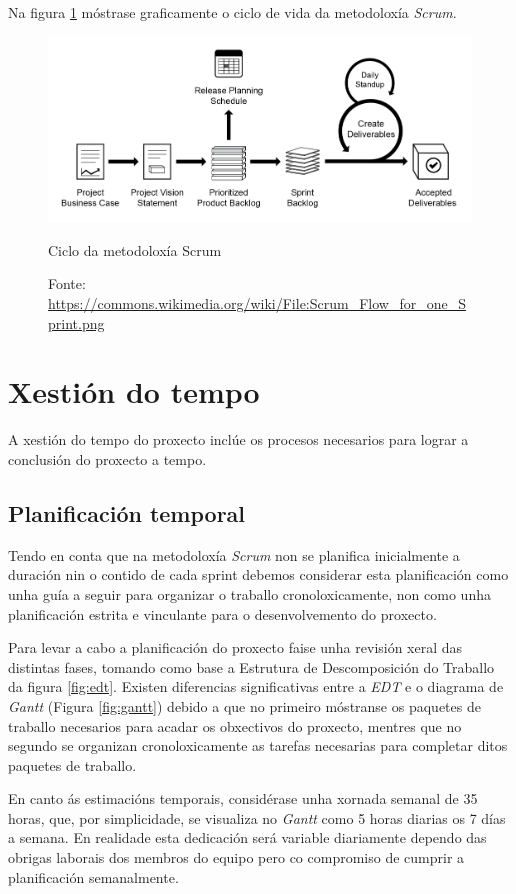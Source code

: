Na figura \ref{fig:scrum} móstrase graficamente o ciclo de vida da metodoloxía \emph{Scrum}.
\begin{figure}[hbtp]
  \centering
  \includegraphics[width=1.0\textwidth]{images/Scrum.png}
  \caption{Ciclo da metodoloxía Scrum}
  \label{fig:scrum}
  \caption*{Fonte: \url{https://commons.wikimedia.org/wiki/File:Scrum_Flow_for_one_Sprint.png}}
\end{figure}

\section{Xestión do tempo}
A xestión do tempo do proxecto inclúe os procesos necesarios para lograr a conclusión do proxecto a tempo.

\subsection{Planificación temporal}
Tendo en conta que na metodoloxía \emph{Scrum} non se planifica inicialmente a duración nin o contido de cada sprint debemos considerar esta planificación como unha guía a seguir para organizar o traballo cronoloxicamente, non como unha planificación estrita e vinculante para o desenvolvemento do proxecto.

Para levar a cabo a planificación do proxecto faise unha revisión xeral das distintas fases, tomando como base a Estrutura de Descomposición do Traballo da figura \ref{fig:edt}. Existen diferencias significativas entre a \emph{EDT} e o diagrama de \emph{Gantt} (Figura \ref{fig:gantt}) debido a que no primeiro móstranse os paquetes de traballo necesarios para acadar os obxectivos do proxecto, mentres que no segundo se organizan cronoloxicamente as tarefas necesarias para completar ditos paquetes de traballo.

En canto ás estimacións temporais, considérase unha xornada semanal de 35 horas, que, por simplicidade, se visualiza no \emph{Gantt} como 5 horas diarias os 7 días a semana. En realidade esta dedicación será variable diariamente dependo das obrigas laborais dos membros do equipo pero co compromiso de cumprir a planificación semanalmente.

